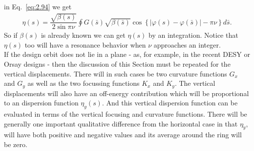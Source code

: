  in Eq.~\eqref{eq:2.94} we get
\begin{align}
	\boxed{ \eta(s) = \dfrac{\sqrt{\beta(s)}}{2\sin\pi\nu}\oint G(\bar{s})\sqrt{\beta(\bar{s})}\cos\left\lbrace |\varphi(s) - \varphi(\bar{s})| - \pi\nu \right\rbrace d\bar{s}}.
\end{align}
So if $\beta(s)$ is already known we can get $\eta(s)$ by an integration. Notice that $\eta(s)$ too will have a resonance behavior when $\nu$ approaches an integer.\\
If the design orbit does not lie in a plane - as, for example, in the recent DESY or Orsay designs - then the discussion of this Section must be repeated for the vertical displacements.
 There will in such cases be two curvature functions $G_x$ and $G_y$ as well as the two focussing functions $K_x$ and $K_y$. The vertical displacements will also have an off-energy contribution which will be proportional to an dispersion function $\eta_y(s)$. And this vertical
 dispersion function can be evaluated in terms of the vertical focusing and curvature functions.
 There will be generally one important qualitative difference from the horizontal case in that $\eta_y$, will have both positive and negative values and its average around the ring will be zero.
